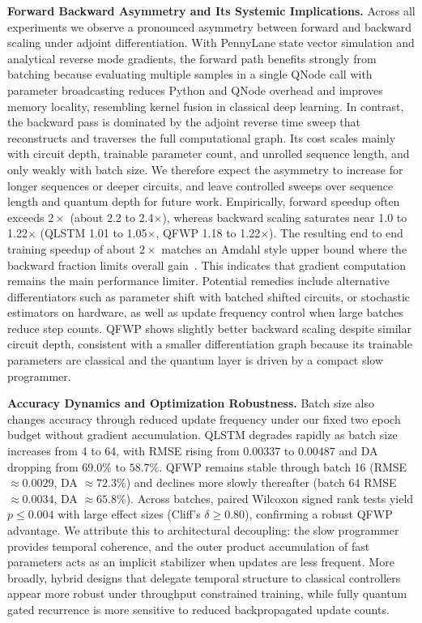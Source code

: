 \documentclass{article}
\begin{document}
\textbf{Forward Backward Asymmetry and Its Systemic Implications.}
Across all experiments we observe a pronounced asymmetry between forward and backward scaling under adjoint differentiation. With PennyLane state vector simulation and analytical reverse mode gradients, the forward path benefits strongly from batching because evaluating multiple samples in a single QNode call with parameter broadcasting reduces Python and QNode overhead and improves memory locality, resembling kernel fusion in classical deep learning. In contrast, the backward pass is dominated by the adjoint reverse time sweep that reconstructs and traverses the full computational graph. Its cost scales mainly with circuit depth, trainable parameter count, and unrolled sequence length, and only weakly with batch size. We therefore expect the asymmetry to increase for longer sequences or deeper circuits, and leave controlled sweeps over sequence length and quantum depth for future work. Empirically, forward speedup often exceeds $2\times$ (about 2.2 to 2.4$\times$), whereas backward scaling saturates near 1.0 to 1.22$\times$ (QLSTM 1.01 to 1.05$\times$, QFWP 1.18 to 1.22$\times$). The resulting end to end training speedup of about $2\times$ matches an Amdahl style upper bound where the backward fraction limits overall gain~\cite{amdahl1967validity}. This indicates that gradient computation remains the main performance limiter. Potential remedies include alternative differentiators such as parameter shift with batched shifted circuits, or stochastic estimators on hardware, as well as update frequency control when large batches reduce step counts. QFWP shows slightly better backward scaling despite similar circuit depth, consistent with a smaller differentiation graph because its trainable parameters are classical and the quantum layer is driven by a compact slow programmer.







\textbf{Accuracy Dynamics and Optimization Robustness.}
Batch size also changes accuracy through reduced update frequency under our fixed two epoch budget without gradient accumulation. QLSTM degrades rapidly as batch size increases from 4 to 64, with RMSE rising from $0.00337$ to $0.00487$ and DA dropping from $69.0\%$ to $58.7\%$. QFWP remains stable through batch 16 (RMSE $\approx0.0029$, DA $\approx72.3\%$) and declines more slowly thereafter (batch 64 RMSE $\approx0.0034$, DA $\approx65.8\%$). Across batches, paired Wilcoxon signed rank tests yield $p\le0.004$ with large effect sizes (Cliff's $\delta\ge0.80$), confirming a robust QFWP advantage. We attribute this to architectural decoupling: the slow programmer provides temporal coherence, and the outer product accumulation of fast parameters acts as an implicit stabilizer when updates are less frequent. More broadly, hybrid designs that delegate temporal structure to classical controllers appear more robust under throughput constrained training, while fully quantum gated recurrence is more sensitive to reduced backpropagated update counts.
\end{document}
